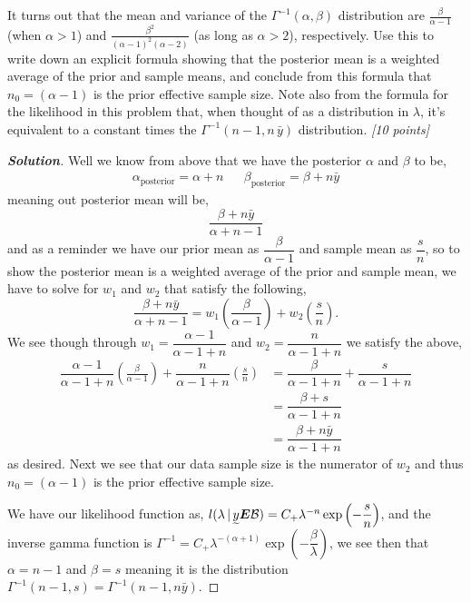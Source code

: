 \documentclass[12pt]{article}
\newcommand{\given}{\, | \,}
\newcommand{\lrp}[1]{\left(#1\right)}
\newenvironment{solution}{\begin{proof}[\textbf{\textit{Solution}}] }{\end{proof}}
\begin{document}
\begin{itemize}
\begin{itemize}
It turns out that the mean and variance of the $\Gamma^{ -1 } (
\alpha, \beta )$ distribution are $\frac{ \beta }{ \alpha - 1}$ (when $\alpha > 1$) and $\frac{ \beta^2 }{ ( \alpha - 1 )^2 ( \alpha - 2 ) }$ (as long as
$\alpha > 2$), respectively. Use this to write down an explicit formula showing that the posterior mean is a weighted average of the prior and sample means, and
conclude from this formula that $n_0 = ( \alpha - 1 )$ is the prior effective
sample size. Note also from the formula for the likelihood in this problem
that, when thought of as a distribution in $\lambda$, it's equivalent to a
constant times the $\Gamma^{ -1 } ( n - 1, n \, \bar{ y } )$ distribution. \textit{[10 points]} 
\begin{tcolorbox}[breakable]
    \begin{solution}
        Well we know from above that we have the posterior $\alpha$ and $\beta$ to be,
        \begin{align*}
            \alpha_{\text{posterior}} = \alpha + n && \beta_{\text{posterior}} = \beta + n\bar{y}
        \end{align*} 
        meaning out posterior mean will be,
        \[\frac{\beta + n\bar{y}}{\alpha + n - 1}\]
        and as a reminder we have our prior mean as $\dfrac{\beta}{\alpha - 1}$ and sample mean as $\dfrac{s}{n}$, so to show the posterior mean is a weighted average of the prior and sample mean, we have to solve for $w_1$ and $w_2$ that satisfy the following,
        \[\frac{\beta + n\bar{y}}{\alpha + n - 1} = w_1 \left(\frac{\beta}{\alpha -1 }\right) + w_2 \left(\frac{s}{n}\right).\]
        We see though through $w_1 = \dfrac{\alpha-1}{\alpha- 1 + n}$ and $w_2 = \dfrac{n}{\alpha -1 + n}$ we satisfy the above,
        \begin{align*}
            \dfrac{\alpha-1}{\alpha- 1 + n}\left(\frac{\beta}{\alpha -1 }\right) + \dfrac{n}{\alpha -1 + n}\left(\frac{s}{n}\right)&= \dfrac{\beta}{\alpha -1 + n} + \dfrac{s}{\alpha -1 + n} \\
            &= \dfrac{\beta + s}{\alpha -1 + n} \\
            &= \dfrac{\beta + n \bar{y}}{\alpha -1 + n}
        \end{align*}
        as desired. Next we see that our data sample size is the numerator of $w_2$ and thus $n_0 = (\alpha -1)$ is the prior effective sample size.
    
        We have our likelihood function as, $l(\lambda \given \undertilde{y}\bm{E}\mathcal{B}) = C_+ \lambda^{-n}\exp\lrp{-\dfrac{s}{n}}$, and the inverse gamma function is $\Gamma^{-1} = C_+\lambda^{-(\alpha + 1)}\exp\lrp{-\dfrac{\beta}{\lambda}}$, we see then that $\alpha = n -1$ and $\beta = s$ meaning it is the distribution $\Gamma^{-1}(n-1, s) = \Gamma^{-1}(n-1, n\bar{y})$.
    \end{solution}
\end{tcolorbox}



\end{itemize}
\end{itemize}
\end{document}
